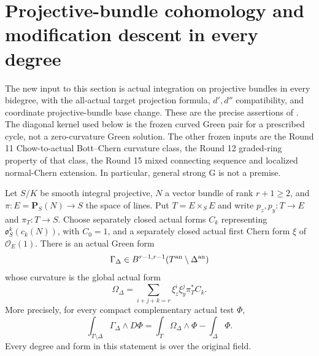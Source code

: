 \section{Projective-bundle cohomology and modification descent in every degree}
\label{r16pb:section}

The new input to this section is actual integration on projective bundles
in every bidegree, with the all-actual target projection formula,
$d',d''$ compatibility, and coordinate projective-bundle base change.
These are the precise assertions of
.
The diagonal kernel used below is the frozen curved Green pair for a
prescribed cycle, not a zero-curvature Green solution. The other frozen
inputs are the Round 11 Chow-to-actual Bott--Chern curvature class,
the Round 12 graded-ring property of that class, the Round 15 mixed
connecting sequence and localized normal-Chern extension. In particular,
general strong G is not a premise.

\begin{lemma}
\label{r16pb:diagonal}
Let $S/K$ be smooth integral projective, $N$ a vector bundle of rank
$r+1\geq2$, and $\pi:E=\mathbf P_S(N)\to S$ the space of lines.
Put $T=E\times_S E$ and write $p_z,p_y:T\to E$ and $\pi_T:T\to S$.
Choose separately closed actual forms $C_k$ representing
$\mathfrak o_S^k(c_k(N))$, with $C_0=1$, and a separately closed
actual first Chern form $\xi$ of $\mathcal O_E(1)$. There is an actual
Green form
\[
 \Gamma_\Delta\in B^{r-1,r-1}(T^{\rm an}\setminus\Delta^{\rm an})
\]
whose curvature is the global actual form
\[
 \Omega_\Delta=
       \sum_{i+j+k=r}\xi_z^i\xi_y^j\pi_T^*C_k.
 \tag{PB16.1}\label{r16pb:diagonal-polynomial}
\]
More precisely, for every compact complementary actual test $\Phi$,
\[
 \int_{T\setminus\Delta}\Gamma_\Delta\wedge D\Phi
       =\int_T\Omega_\Delta\wedge\Phi-\int_\Delta\Phi.
 \tag{PB16.2}\label{r16pb:diagonal-green}
\]
Every degree and form in this statement is over the original field.
\end{lemma}

